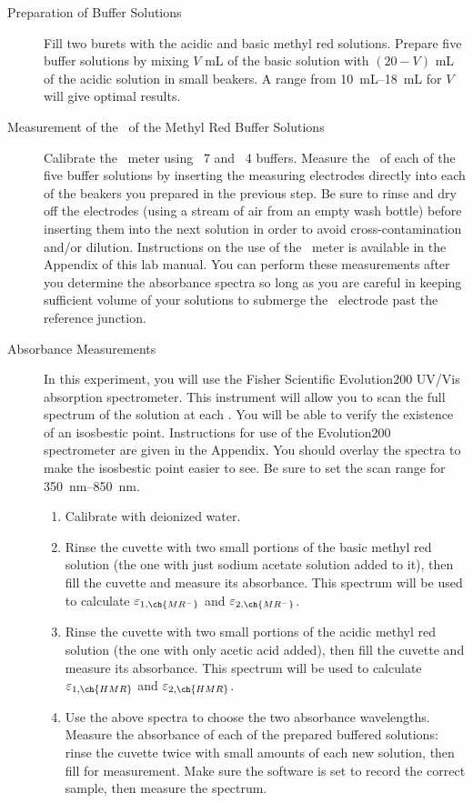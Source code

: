 \begin{description}
	\item[Preparation of Buffer Solutions] 
	Fill two burets with the acidic and basic methyl red solutions. 
	Prepare five buffer solutions by mixing \(V\) \unit{\mL} of the basic solution with \((20-V)\) \unit{\mL} of the acidic solution in small beakers. 
	A range from \qtyrange{10}{18}{\mL} for \(V\) will give optimal results. 
	\item[Measurement of the \pH\ of the Methyl Red Buffer Solutions]
	Calibrate the \pH\ meter using \pH\ 7 and \pH\ 4 buffers. 
	Measure the \pH\ of each of the five buffer solutions by inserting the measuring electrodes directly into each of the beakers you prepared in the previous step. 
	Be sure to rinse and dry off the electrodes (using a stream of air from an empty wash bottle) before inserting them into the next solution in order to avoid cross-contamination and/or dilution. 
	Instructions on the use of the \pH\ meter is available in the Appendix of this lab manual. 
	You can perform these measurements after you determine the absorbance spectra so long as you are careful in keeping sufficient volume of your solutions to submerge the \pH\ electrode past the reference junction. 
	\item[Absorbance Measurements]
	In this experiment, you will use the Fisher Scientific Evolution200 UV/Vis absorption spectrometer. 
	This instrument will allow you to scan the full spectrum of the solution at each \pH. 
	You will be able to verify the existence of an isosbestic point. 
	Instructions for use of the Evolution200 spectrometer are given in the Appendix. 
	You should overlay the spectra to make the isosbestic point easier to see. 
	Be sure to set the scan range for \qtyrange{350}{850}{\nm}. 
	\begin{enumerate}
		\item Calibrate with deionized water.
		\item Rinse the cuvette with two small portions of the basic methyl red solution (the one with just sodium acetate solution added to it), then fill the cuvette and measure its absorbance. 
		This spectrum will be used to calculate \(\varepsilon_{1, \ch{MR^-}}\) and \(\varepsilon_{2, \ch{MR^-}}\). 
		\item Rinse the cuvette with two small portions of the acidic methyl red solution (the one with only acetic acid added), then fill the cuvette and measure its absorbance. 
		This spectrum will be used to calculate \(\varepsilon_{1, \ch{HMR}}\) and \(\varepsilon_{2, \ch{HMR}}\).
		\item Use the above spectra to choose the two absorbance wavelengths. 
		Measure the absorbance of each of the prepared buffered solutions: rinse the cuvette twice with small amounts of each new solution, then fill for measurement. 
		Make sure the software is set to record the correct sample, then measure the spectrum. 
	\end{enumerate}
\end{description}

